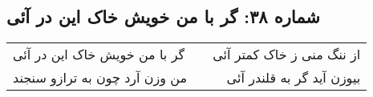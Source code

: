 \begin{center}
\section*{شماره ۳۸: گر با من خویش خاک این در آئی}
\label{sec:038}
\begin{longtable}{l p{0.5cm} r}
گر با من خویش خاک این در آئی
&&
از ننگ منی ز خاک کمتر آئی
\\
من وزن آرد چون به ترازو سنجند
&&
بیوزن آید گر به قلندر آئی
\\
\end{longtable}
\end{center}
